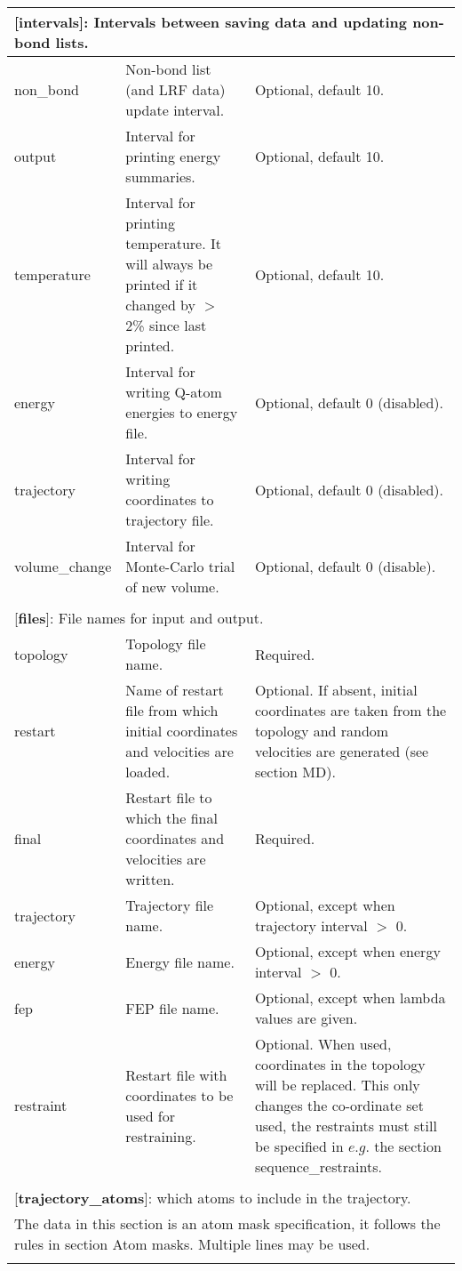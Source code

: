\documentclass[a4paper,10pt]{article}
\begin{document}
\begin{longtable}{|p{78pt}|p{158pt}|p{158pt}|}
\multicolumn{3}{p{394pt}}{[\textbf{intervals}]: Intervals between saving data and updating non-bond lists.}\\
\hline non\_bond & Non-bond list (and LRF data) update interval. & Optional, default 10.\\
\hline output & Interval for printing energy summaries. & Optional, default 10.\\
\hline temperature & Interval for printing temperature. It will always be printed if it changed by $>$ 2\% since last printed. & Optional, default 10.\\
\hline energy & Interval for writing Q-atom energies to energy file. & Optional, default 0 (disabled).\\
\hline trajectory & Interval for writing coordinates to trajectory file. & Optional, default 0 (disabled).\\
\hline volume\_change & Interval for Monte-Carlo trial of new volume. & Optional, default 0 (disable).\\
\hline
\multicolumn{3}{p{394pt}}{}\\

\multicolumn{3}{p{394pt}}{[\textbf{files}]: File names for input and output.}\\
\hline topology &  Topology file name. & Required.\\
\hline restart & Name of restart file from which initial coordinates and velocities are loaded. & Optional. If absent, initial coordinates are taken from the topology and random velocities are generated (see section MD).\\
\hline final & Restart file to which the final coordinates and velocities are written. & Required.\\
\hline trajectory & Trajectory file name. & Optional, except when trajectory interval $>$ 0.\\
\hline energy & Energy file name. & Optional, except when energy interval $>$ 0.\\
\hline fep & FEP file name. & Optional, except when lambda values are given.\\
\hline restraint & Restart file with coordinates to be used for restraining. & Optional. When used, coordinates in the topology will be replaced. This only changes the co-ordinate set used, the restraints must still be specified in $e.g.$ the section sequence\_restraints.\\
\hline
\multicolumn{3}{p{394pt}}{}\\

\multicolumn{3}{p{394pt}}{[\textbf{trajectory\_atoms}]: which atoms to include in the trajectory.}\\
\hline
\multicolumn{3}{|p{394pt}|}{The data in this section is an atom mask specification, it follows the rules in section Atom masks. Multiple lines may be used.}\\
\hline
\multicolumn{3}{p{394pt}}{}\\


\end{longtable}
\end{document}
